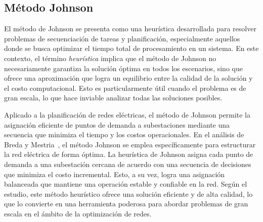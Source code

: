 \documentclass[9pt,a4paper,twoside]{rho-class/rho}
\begin{document}
        \subsection{Método Johnson}
            El método de Johnson se presenta como una heurística desarrollada para resolver problemas de secuenciación de tareas y planificación, especialmente aquellos donde se busca optimizar el tiempo total de procesamiento en un sistema. En este contexto, el término \textit{heurística} implica que el método de Johnson no necesariamente garantiza la solución óptima en todos los escenarios, sino que ofrece una aproximación que logra un equilibrio entre la calidad de la solución y el costo computacional. Esto es particularmente útil cuando el problema es de gran escala, lo que hace inviable analizar todas las soluciones posibles.
            \par\medskip            
            Aplicado a la planificación de redes eléctricas, el método de Johnson permite la asignación eficiente de puntos de demanda a subestaciones mediante una secuencia que minimiza el tiempo y los costos operacionales. En el análisis de Breda y Mestria~\cite{Breda2023}, el método Johnson se emplea específicamente para estructurar la red eléctrica de forma óptima. La heurística de Johnson asigna cada punto de demanda a una subestación cercana de acuerdo con una secuencia de decisiones que minimiza el costo incremental. Esto, a su vez, logra una asignación balanceada que mantiene una operación estable y confiable en la red. Según el estudio, este método heurístico ofrece una solución eficiente y de alta calidad, lo que lo convierte en una herramienta poderosa para abordar problemas de gran escala en el ámbito de la optimización de redes.
\end{document}
